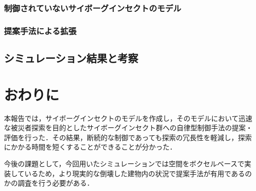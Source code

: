 \documentclass[a4paper,11pt]{jarticle}
\begin{document}
	\subsubsection{制御されていないサイボーグインセクトのモデル}
	\subsubsection{提案手法による拡張}
	\subsection{シミュレーション結果と考察}
	\section{おわりに}
	\label{sec:last}
	本報告では，サイボーグインセクトのモデルを作成し，そのモデルにおいて迅速な被災者探索を目的としたサイボーグインセクト群への自律型制御手法の提案・評価を行った．その結果，断続的な制御であっても探索の冗長性を軽減し，探索にかかる時間を短くすることができることが分かった．
	
	今後の課題として，今回用いたシミュレーションでは空間をボクセルベースで実装しているため，より現実的な倒壊した建物内の状況で提案手法が有用であるのかの調査を行う必要がある．
\end{document}
